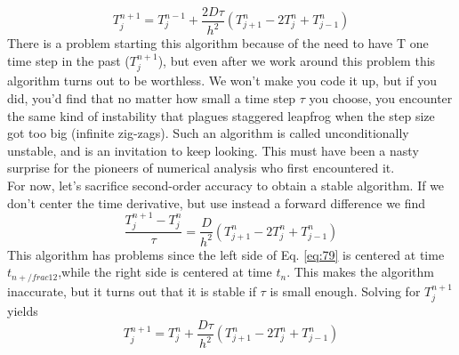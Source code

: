 \begin{equation}\label{eq:78}
T_{j}^{n+1}=T_{j}^{n-1}+\frac{2 D \tau}{h^{2}}\left(T_{j+1}^{n}-2 T_{j}^{n}+T_{j-1}^{n}\right)
\end{equation}
There is a problem starting this algorithm because of the need to have T one time
step in the past ($T_j^{n+1}$), but even after we work around this problem this algorithm
turns out to be worthless. We won\rq t make you code it up, but if you did, you\rq d
find that no matter how small a time step $\tau$ you choose, you encounter the same
kind of instability that plagues staggered leapfrog when the step size got too big
(infinite zig-zags). Such an algorithm is called unconditionally unstable, and is an
invitation to keep looking. This must have been a nasty surprise for the pioneers
of numerical analysis who first encountered it. \\ 
For now, let\rq s sacrifice second-order accuracy to obtain a stable algorithm. If
we don\rq t center the time derivative, but use instead a forward difference we find
\begin{equation}\label{eq:79}
\frac{T_{j}^{n+1}-T_{j}^{n}}{\tau}=\frac{D}{h^{2}}\left(T_{j+1}^{n}-2 T_{j}^{n}+T_{j-1}^{n}\right)
\end{equation}
This algorithm has problems since the left side of Eq. \ref{eq:79} is centered at time $t_{n+/frac{1}{2}}$,while the right side is centered at time $t_n$. This makes the algorithm inaccurate, but it turns out that it is stable if $\tau$ is small enough. Solving for $T_j^{n+1}$ yields
\begin{equation}\label{eq:710}
T_{j}^{n+1}=T_{j}^{n}+\frac{D \tau}{h^{2}}\left(T_{j+1}^{n}-2 T_{j}^{n}+T_{j-1}^{n}\right)
\end{equation}
